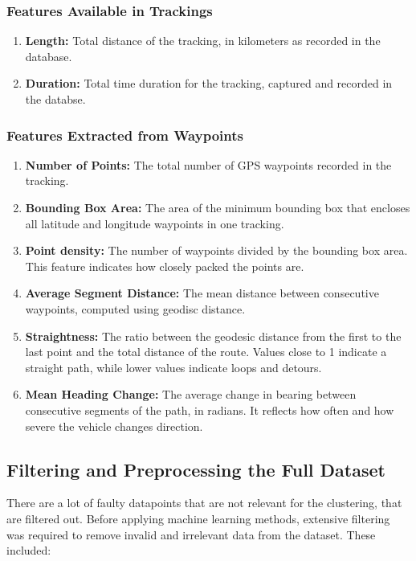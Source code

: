 \documentclass[a4paper,12pt,twoside]{scrreprt}
\begin{document}
\subsubsection{Features Available in Trackings}

\begin{enumerate}
  \item \textbf{Length:} Total distance of the tracking, in kilometers as
        recorded in the database.
  \item \textbf{Duration:} Total time duration for the tracking, captured and
        recorded in the databse.
\end{enumerate}

\subsubsection{Features Extracted from Waypoints}

\begin{enumerate}
  \item \textbf{Number of Points:} The total number of GPS waypoints recorded
        in the tracking.
  \item \textbf{Bounding Box Area:} The area of the minimum bounding box that
        encloses all latitude and longitude waypoints in one tracking.
  \item \textbf{Point density:} The number of waypoints divided by the bounding
        box area. This feature indicates how closely packed the points are.
  \item \textbf{Average Segment Distance:} The mean distance between
        consecutive waypoints, computed using geodisc distance.
  \item \textbf{Straightness:} The ratio between the geodesic distance from the
        first to the last point and the total distance of the route. Values
        close to 1
        indicate a straight path, while lower values indicate loops and
        detours.
  \item \textbf{Mean Heading Change:} The average change in bearing between
        consecutive segments of the path, in radians. It reflects how often and
        how
        severe the vehicle changes direction.
\end{enumerate}

\subsection{Filtering and Preprocessing the Full Dataset}
There are a lot of faulty datapoints that are not relevant for the
clustering, that are filtered out. Before applying machine learning methods,
extensive filtering was required to
remove invalid and irrelevant data from the dataset. These included:
\end{document}

